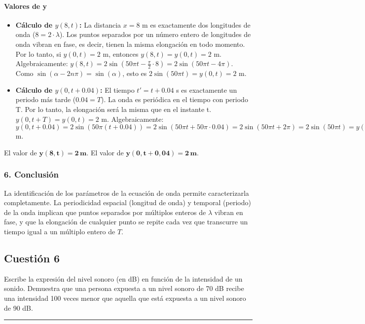 \paragraph*{Valores de y}
\begin{itemize}
    \item \textbf{Cálculo de $y(8,t)$:}
    La distancia $x=8$ m es exactamente dos longitudes de onda ($8 = 2 \cdot \lambda$). Los puntos separados por un número entero de longitudes de onda vibran en fase, es decir, tienen la misma elongación en todo momento. Por lo tanto, si $y(0,t)=2$ m, entonces $y(8,t)=y(0,t)=2$ m.
    Algebraicamente: $y(8,t) = 2\sin(50\pi t - \frac{\pi}{2} \cdot 8) = 2\sin(50\pi t - 4\pi)$. Como $\sin(\alpha - 2n\pi) = \sin(\alpha)$, esto es $2\sin(50\pi t) = y(0,t) = 2$ m.
    \item \textbf{Cálculo de $y(0,t+0.04)$:}
    El tiempo $t'=t+0.04$ s es exactamente un periodo más tarde ($0.04 = T$). La onda es periódica en el tiempo con periodo T. Por lo tanto, la elongación será la misma que en el instante t. $y(0,t+T) = y(0,t) = 2$ m.
    Algebraicamente: $y(0,t+0.04) = 2\sin(50\pi(t+0.04)) = 2\sin(50\pi t + 50\pi \cdot 0.04) = 2\sin(50\pi t + 2\pi) = 2\sin(50\pi t) = y(0,t) = 2$ m.
\end{itemize}
\begin{cajaresultado}
    El valor de $\boldsymbol{y(8,t) = 2 \, m}$. El valor de $\boldsymbol{y(0,t+0,04) = 2 \, m}$.
\end{cajaresultado}

\subsubsection*{6. Conclusión}
\begin{cajaconclusion}
La identificación de los parámetros de la ecuación de onda permite caracterizarla completamente. La periodicidad espacial (longitud de onda) y temporal (periodo) de la onda implican que puntos separados por múltiplos enteros de $\lambda$ vibran en fase, y que la elongación de cualquier punto se repite cada vez que transcurre un tiempo igual a un múltiplo entero de $T$.
\end{cajaconclusion}

\newpage

\subsection{Cuestión 6}
\label{subsec:C6_2023_jul_ord}

\begin{cajaenunciado}
Escribe la expresión del nivel sonoro (en dB) en función de la intensidad de un sonido. Demuestra que una persona expuesta a un nivel sonoro de 70 dB recibe una intensidad 100 veces menor que aquella que está expuesta a un nivel sonoro de 90 dB.
\end{cajaenunciado}
\hrule


